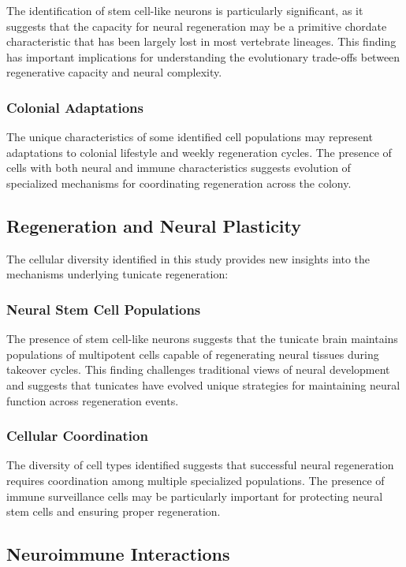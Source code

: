 \documentclass[12pt,a4paper]{article}
\begin{document}
The identification of stem cell-like neurons is particularly significant, as it suggests that the capacity for neural regeneration may be a primitive chordate characteristic that has been largely lost in most vertebrate lineages. This finding has important implications for understanding the evolutionary trade-offs between regenerative capacity and neural complexity.

\subsubsection{Colonial Adaptations}
The unique characteristics of some identified cell populations may represent adaptations to colonial lifestyle and weekly regeneration cycles. The presence of cells with both neural and immune characteristics suggests evolution of specialized mechanisms for coordinating regeneration across the colony.

\subsection{Regeneration and Neural Plasticity}

The cellular diversity identified in this study provides new insights into the mechanisms underlying tunicate regeneration:

\subsubsection{Neural Stem Cell Populations}
The presence of stem cell-like neurons suggests that the tunicate brain maintains populations of multipotent cells capable of regenerating neural tissues during takeover cycles. This finding challenges traditional views of neural development and suggests that tunicates have evolved unique strategies for maintaining neural function across regeneration events.

\subsubsection{Cellular Coordination}
The diversity of cell types identified suggests that successful neural regeneration requires coordination among multiple specialized populations. The presence of immune surveillance cells may be particularly important for protecting neural stem cells and ensuring proper regeneration.

\subsection{Neuroimmune Interactions}
\end{document}
